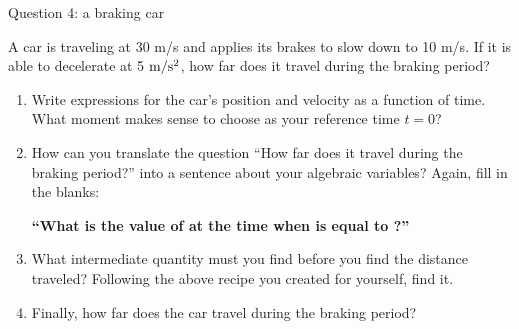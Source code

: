 \documentclass[12pt]{article}
\begin{document}
\newpage


\centerline{\Large Question 4: a braking car}

A car is traveling at 30 m/s and applies its brakes to slow down to 10 m/s. If it is able to decelerate at 5 $\rm m/\rm s^2$, how far does it travel during the braking period?

\begin{enumerate}
	\item Write expressions for the car's position and velocity as a function of time. What moment makes sense to choose as your reference time $t=0$?
	
	\vspace{1in}
	
	
	\item How can you translate the question ``How far does it travel during the braking period?'' into a sentence about your algebraic variables? Again, fill in the blanks: 
	
	\begin{center}
		{\bf ``What is the value of \underline{\hspace{0.7in}} at the time when \underline{\hspace{0.7in}} is equal to \underline{\hspace{0.7in}}?''} 
	\end{center}
	
	
	\item What intermediate quantity must you find before you find the distance traveled? Following the above recipe you created for yourself, find it.
	
	
	
	
	\vspace{2in}
	
	
	
	
	
	\item Finally, how far does the car travel during the braking period?
	
	\newpage


\end{enumerate}
\end{document}
